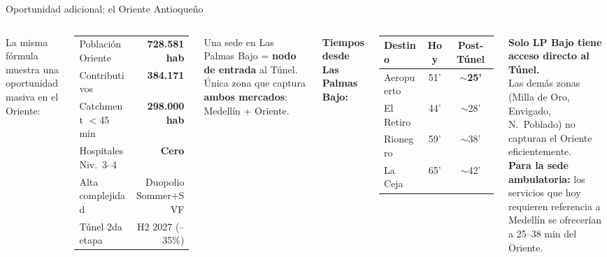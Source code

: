 \documentclass[aspectratio=169, 11pt]{beamer}
\begin{document}
\begin{frame}{Oportunidad adicional: el Oriente Antioque\~{n}o}

\begin{columns}[T]
\vspace{2pt}
{\scriptsize La misma f\'{o}rmula muestra una oportunidad masiva en el Oriente:}

\vspace{4pt}
{\scriptsize
\begin{tabular}{@{}lr@{}}
\toprule
Poblaci\'{o}n Oriente & \textbf{728.581 hab} \\
Contributivos & \textbf{384.171} \\
Catchment $<$45 min & \textbf{298.000 hab} \\
Hospitales Niv.\ 3--4 & \textcolor{comp}{\textbf{Cero}} \\
Alta complejidad & Duopolio Sommer+SVF \\
T\'{u}nel 2da etapa & H2 2027 (--35\%) \\
\bottomrule
\end{tabular}
}

\vspace{4pt}
{\scriptsize Una sede en Las Palmas Bajo = \textbf{nodo de entrada} al T\'{u}nel. \'{U}nica zona que captura \textbf{ambos mercados}: Medell\'{i}n + Oriente.}

\vspace{2pt}
{\scriptsize\textbf{Tiempos desde Las Palmas Bajo:}}
\vspace{2pt}

{\scriptsize
\begin{tabular}{@{}lcc@{}}
\toprule
\textbf{Destino} & \textbf{Hoy} & \textbf{Post-T\'{u}nel} \\
\midrule
\rowcolor{acc!8}
Aeropuerto & 51' & \textcolor{acc}{\textbf{$\sim$25'}} \\
El Retiro & 44' & $\sim$28' \\
Rionegro & 59' & $\sim$38' \\
La Ceja & 65' & $\sim$42' \\
\bottomrule
\end{tabular}
}

\vspace{4pt}
{\scriptsize\textbf{Solo LP Bajo tiene acceso directo al T\'{u}nel.}\\
Las dem\'{a}s zonas (Milla de Oro, Envigado, N.\ Poblado) no capturan el Oriente eficientemente.\\[3pt]
\textbf{Para la sede ambulatoria:} los servicios que hoy requieren referencia a Medell\'{i}n se ofrecer\'{i}an a 25--38 min del Oriente.}
\end{columns}
\end{frame}
\end{document}
